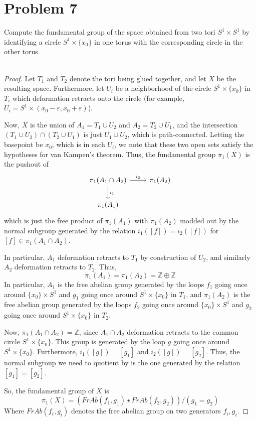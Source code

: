 \documentclass[fontsize=11pt]{scrartcl} %
\numberwithin{equation}{section} %
\numberwithin{figure}{section} %
\numberwithin{table}{section} %
\newcommand{\Z}{\mathbb{Z}}
\begin{document}
\newpage
\section*{Problem 7}
Compute the fundamental group of the space obtained from two tori $S^1\times
S^1$ by identifying a circle $S^1\times \{x_0\}$ in one torus with the
corresponding circle in the other torus.
\\
\\
\begin{proof}
    Let $T_1$ and $T_2$ denote the tori being glued together, and let $X$ be the
    resulting space.
    Furthermore, let $U_i$ be a neighborhood of the circle $S^1\times \{x_0\}$
    in $T_i$ which deformation retracts onto the circle (for example, $U_i =
    S^1\times (x_0-\varepsilon,x_0+\varepsilon)$).

    Now, $X$ is the union of $A_1 = T_1\cup U_2$ and $A_2 = T_2\cup U_1$, and the
    intersection $(T_1\cup U_2) \cap (T_2\cup U_1)$ is just $U_1\cup U_2$, which
    is path-connected. Letting the basepoint be $x_0$, which is in each $U_i$,
    we note that these two open sets satisfy the hypotheses for van Kampen's
    theorem. Thus, the fundamental group $\pi_1(X)$ is the pushout of
    \[
        \begin{tikzcd}
            \pi_1(A_1\cap A_2)\arrow{d}{i_1}\arrow{r}{i_2} &\pi_1(A_2)\\
            \pi_1(A_1)
        \end{tikzcd}
    \]
    which is just the free product of $\pi_1(A_1)$ with $\pi_1(A_2)$ modded out
    by the normal subgroup generated by the relation $i_1([f]) = i_2([f])$ for
    $[f]\in \pi_1(A_1\cap A_2)$.

    In particular, $A_1$ deformation retracts to $T_1$ by construction of
    $U_2$, and similarly $A_2$ deformation retracts to $T_2$. Thus,
    \[
        \pi_1(A_1) = \pi_1(A_2) = \Z\oplus\Z
    \]
    In particular, $A_1$ is the free abelian group
    generated by the loops $f_1$ going once around $\{x_0\}\times S^1$ and $g_1$
    going once around $S^1\times \{x_0\}$ in
    $T_1$, and $\pi_1(A_2)$ is the free abelian group generated by the loops $f_2$
    going once around $\{x_0\}\times S^1$ and $g_2$ going once around $S^1\times
    \{x_0\}$ in $T_2$. 

    Now, $\pi_1(A_1\cap A_2) = \Z$, since $A_1\cap A_2$ deformation retracts to
    the common circle $S^1\times \{x_0\}$. This group is generated by the loop
    $g$ going once around $S^1\times \{x_0\}$. Furthermore, $i_1([g]) = [g_1]$
    and $i_2([g]) = [g_2]$. Thus, the normal subgroup we need to quotient by is
    the one generated by the relation $[g_1] = [g_2]$.

    So, the fundamental group of $X$ is
    \[
        \pi_1(X) = (FrAb(f_1,g_1)\star FrAb(f_2,g_2))/{(g_1=g_2)}
    \]
    Where $FrAb(f_i,g_i)$ denotes the free abelian group on two generators
    $f_i,g_i$.

\end{proof}
\end{document}
